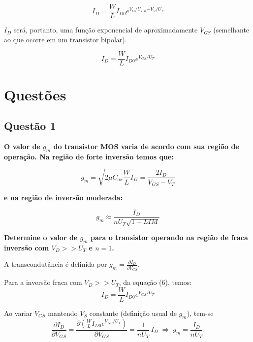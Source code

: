 ﻿\documentclass[12pt,a4paper]{article}
\begin{document}
\begin{equation}
I_D = \frac{W}{L} I_{D0} e^{V_G/U_T} e^{-V_S/U_T}
\end{equation}

$I_D$ será, portanto, uma função exponencial de aproximadamente $V_{GS}$ (semelhante ao que ocorre em um transistor bipolar).

\begin{equation}
I_D = \frac{W}{L} I_{D0} e^{V_{GS}/U_T}
\end{equation}

\newpage

\section*{Questões}

\subsection*{Questão 1}
\textbf{O valor de $g_m$ do transistor MOS varia de acordo com sua região de operação. Na região de forte inversão temos que:}

\begin{equation}
g_m = \sqrt{2\mu C_{ox} \frac{W}{L} I_D} = \frac{2I_D}{V_{GS} - V_T}
\end{equation}

\textbf{e na região de inversão moderada:}

\begin{equation}
g_m \approx \frac{I_D}{nU_T \sqrt{1 +LIM}} 
\end{equation}

\textbf{Determine o valor de $g_m$ para o transistor operando na região de fraca inversão com $V_D >> U_T$ e $n = 1$.}

A transcondutância é definida por $g_m = \frac{\partial I_D}{\partial V_{GS}}$.

Para a inversão fraca com $V_D >> U_T$, da equação (6), temos:
\begin{equation*}
I_D = \frac{W}{L} I_{D0} e^{V_{GS}/U_T}
\end{equation*}

Ao variar $V_{GS}$ mantendo $V_S$ constante (definição usual de $g_m$), tem-se
\begin{equation*}
\frac{\partial I_D}{\partial V_{GS}} = \frac{\partial (\frac{W}{L} I_{D0} e^{V_{GS}/U_T})}{\partial V_{GS}} = \frac{1}{nU_T}\, I_D \;\Rightarrow\; g_m = \frac{I_D}{nU_T}.
\end{equation*}
\end{document}
